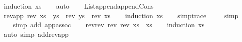 \begin{isabellebody}
\isamarkupfalse%
\ {\isacharparenleft}{\kern0pt}induction\ xs{\isacharparenright}{\kern0pt}\isanewline
\ \ \isamarkupfalse%
\ {\isacharparenleft}{\kern0pt}auto{\isacharparenright}{\kern0pt}\isanewline
\ \ \isamarkupfalse%
%
\endisatagproof
{\isafoldproof}%
%
\isadelimproof
\isanewline
%
\endisadelimproof
\isanewline
{}\isamarkupfalse%
\ List{\isachardot}{\kern0pt}append{\isachardot}{\kern0pt}append{\isacharunderscore}{\kern0pt}Cons\isanewline
\isanewline
{}\isamarkupfalse%
\ rev{\isacharunderscore}{\kern0pt}app{\isacharcolon}{\kern0pt}\ {\isachardoublequoteopen}rev{}\ {\isacharparenleft}{\kern0pt}xs\ {\isacharat}{\kern0pt}\ ys{\isacharparenright}{\kern0pt}\ {\isacharequal}{\kern0pt}\ {\isacharparenleft}{\kern0pt}rev{}\ ys{\isacharparenright}{\kern0pt}\ {\isacharat}{\kern0pt}\ {\isacharparenleft}{\kern0pt}rev{}\ xs{\isacharparenright}{\kern0pt}{\isachardoublequoteclose}\isanewline
%
\isadelimproof
\ \ %
\endisadelimproof
%
\isatagproof
{}\isamarkupfalse%
\ {\isacharparenleft}{\kern0pt}induction\ xs{\isacharparenright}{\kern0pt}\isanewline
\ \ \isamarkupfalse%
\ {\isacharbrackleft}{\kern0pt}{\isacharbrackleft}{\kern0pt}simp{\isacharunderscore}{\kern0pt}trace{\isacharbrackright}{\kern0pt}{\isacharbrackright}{\kern0pt}\isanewline
\ \ \ \isamarkupfalse%
\ {\isacharparenleft}{\kern0pt}simp{\isacharparenright}{\kern0pt}\isanewline
\ \ \isamarkupfalse%
\ {\isacharparenleft}{\kern0pt}simp\ add{\isacharcolon}{\kern0pt}\ app{\isacharunderscore}{\kern0pt}assoc{\isacharparenright}{\kern0pt}\isanewline
\ \ \isamarkupfalse%
%
\endisatagproof
{\isafoldproof}%
%
\isadelimproof
\isanewline
%
\endisadelimproof
\isanewline
{}\isamarkupfalse%
\ rev{\isacharunderscore}{\kern0pt}rev{\isacharcolon}{\kern0pt}\ {\isachardoublequoteopen}rev{}\ {\isacharparenleft}{\kern0pt}rev{}\ xs{\isacharparenright}{\kern0pt}\ {\isacharequal}{\kern0pt}\ xs{\isachardoublequoteclose}\isanewline
%
\isadelimproof
\ \ %
\endisadelimproof
%
\isatagproof
{}\isamarkupfalse%
\ {\isacharparenleft}{\kern0pt}induction\ xs{\isacharparenright}{\kern0pt}\isanewline
\ \ \isamarkupfalse%
\ {\isacharparenleft}{\kern0pt}auto\ simp\ add{\isacharcolon}{\kern0pt}rev{\isacharunderscore}{\kern0pt}app{\isacharparenright}{\kern0pt}\isanewline
\ \ \isamarkupfalse%
%
\endisatagproof
{\isafoldproof}%
%
\isadelimproof
%
\endisadelimproof

\end{isabellebody}
